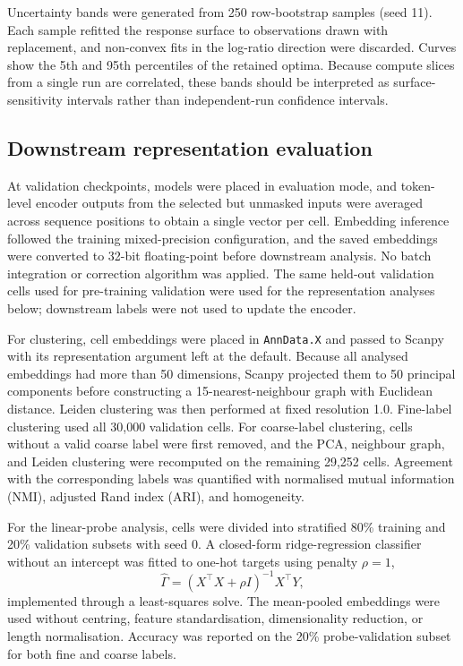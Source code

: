 \documentclass[pdflatex,sn-nature]{sn-jnl}%
\theoremstyle{thmstyleone}%
\theoremstyle{thmstyletwo}%
\theoremstyle{thmstylethree}%
\begin{document}
Uncertainty bands were generated from 250 row-bootstrap samples (seed 11).
Each sample refitted the response surface to observations drawn with replacement, and non-convex fits in the log-ratio direction were discarded.
Curves show the 5th and 95th percentiles of the retained optima.
Because compute slices from a single run are correlated, these bands should be interpreted as surface-sensitivity intervals rather than independent-run confidence intervals.

\subsection{Downstream representation evaluation}
\label{sec:down}

At validation checkpoints, models were placed in evaluation mode, and token-level encoder outputs from the selected but unmasked inputs were averaged across sequence positions to obtain a single vector per cell.
Embedding inference followed the training mixed-precision configuration, and the saved embeddings were converted to 32-bit floating-point before downstream analysis.
No batch integration or correction algorithm was applied.
The same held-out validation cells used for pre-training validation were used for the representation analyses below; downstream labels were not used to update the encoder.

For clustering, cell embeddings were placed in \texttt{AnnData.X} and passed to Scanpy with its representation argument left at the default.
Because all analysed embeddings had more than 50 dimensions, Scanpy projected them to 50 principal components before constructing a 15-nearest-neighbour graph with Euclidean distance.
Leiden clustering was then performed at fixed resolution 1.0.
Fine-label clustering used all 30,000 validation cells.
For coarse-label clustering, cells without a valid coarse label were first removed, and the PCA, neighbour graph, and Leiden clustering were recomputed on the remaining 29,252 cells.
Agreement with the corresponding labels was quantified with normalised mutual information (NMI), adjusted Rand index (ARI), and homogeneity.

For the linear-probe analysis, cells were divided into stratified 80\% training and 20\% validation subsets with seed 0.
A closed-form ridge-regression classifier without an intercept was fitted to one-hot targets using penalty \(\rho=1\),
\begin{equation}
    \widehat{\Gamma}={(X^\top X+\rho I)}^{-1}X^\top Y,
\end{equation}
implemented through a least-squares solve.
The mean-pooled embeddings were used without centring, feature standardisation, dimensionality reduction, or length normalisation.
Accuracy was reported on the 20\% probe-validation subset for both fine and coarse labels.
\end{document}
